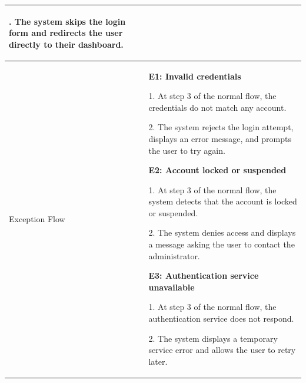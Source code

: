 {\begin{longtable}{|>{\bfseries\raggedright\arraybackslash}p{}|>{\raggedright\arraybackslash}p{}|}
2. The system skips the login form and redirects the user directly to their dashboard. \\ \hline
Exception Flow &
\textbf{E1: Invalid credentials} \par
1. At step 3 of the normal flow, the credentials do not match any account. \par
2. The system rejects the login attempt, displays an error message, and prompts the user to try again. \par\vspace{4pt}
\textbf{E2: Account locked or suspended} \par
1. At step 3 of the normal flow, the system detects that the account is locked or suspended. \par
2. The system denies access and displays a message asking the user to contact the administrator. \par\vspace{4pt}
\textbf{E3: Authentication service unavailable} \par
1. At step 3 of the normal flow, the authentication service does not respond. \par
2. The system displays a temporary service error and allows the user to retry later. \\ \hline
\end{longtable}
}

